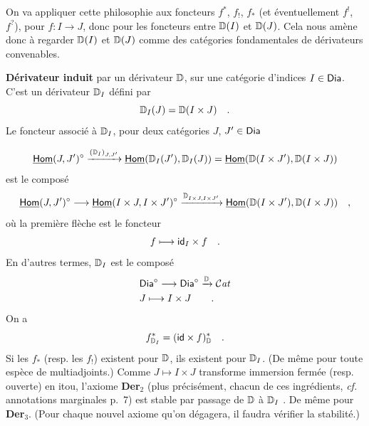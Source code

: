 On va appliquer cette philosophie aux foncteurs $f^*$, $f_!$, $f_*$ (et éventuellement $f^!$, $f^?$), pour $f : I \to J$, donc pour les foncteurs entre $\mathbb{D}(I)$ et $\mathbb{D}(J)$. Cela nous amène donc à regarder $\mathbb{D}(I)$ et $\mathbb{D}(J)$ comme des catégories fondamentales de dérivateurs convenables.

\textbf{Dérivateur induit} par un dérivateur $\mathbb{D}$, sur une catégorie d'indices $I \in \mathsf{Dia}$. C'est un dérivateur $\mathbb{D}_I$ défini par
\[
\mathbb{D}_I(J) = \mathbb{D}(I \times J) \quad .
\]
Le foncteur associé à $\mathbb{D}_I$, pour deux catégories $J$, $J' \in \mathsf{Dia}$

\[
\underline{\mathsf{Hom}}(J,J')^\circ \xrightarrow{(\mathbb{D}_I)_{J,J'}} \underline{\mathsf{Hom}}(\mathbb{D}_I(J'),\mathbb{D}_I(J)) = \underline{\mathsf{Hom}}(\mathbb{D}(I\times J'),\mathbb{D}(I\times J))
\]
est le composé
\[
\underline{\mathsf{Hom}}(J,J')^\circ \longrightarrow \underline{\mathsf{Hom}}(I\times J, I\times J')^\circ \xrightarrow{\mathbb{D}_{I\times J,I\times J'}} \underline{\mathsf{Hom}}(\mathbb{D}(I\times J'),\mathbb{D}(I\times J)) \quad ,
\]
où la première flèche est le foncteur
\[
f \longmapsto \mathsf{id}_I \times f \quad .
\]
En d'autres termes, $\mathbb{D}_I$ est le composé
\[
\begin{aligned}
&\mathsf{Dia}^\circ \longrightarrow \mathsf{Dia}^\circ \xrightarrow{\mathbb{D}} \mathcal{C}\mathit{at} \\
&J \longmapsto I \times J \qquad .
\end{aligned}
\]
On a
\[
f^*_{\mathbb{D}_I} = (\mathsf{id} \times f)^*_{\mathbb{D}} \quad .
\]
Si les $f_*$ (resp. les $f_!$) existent pour $\mathbb{D}$, ils existent pour $\mathbb{D}_I$. (De même pour toute espèce de multiadjoints.) Comme $J \mapsto I \times J$ transforme immersion fermée (resp. ouverte) en itou, l'axiome \textbf{Der}$_2$ (plus précisément, chacun de ces ingrédients, \textit{cf.} annotations marginales p.~7) est stable par passage de $\mathbb{D}$ à $\mathbb{D}_I$ . De même pour \textbf{Der}$_3$. (Pour chaque nouvel axiome qu'on dégagera, il faudra vérifier la stabilité.)



